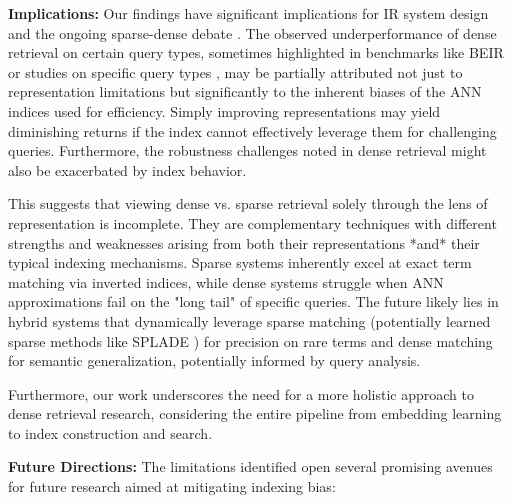 \documentclass[manuscript]{acmart}
\begin{document}
\textbf{Implications:} Our findings have significant implications for IR system design and the ongoing sparse-dense debate \cite{lin2024dense}. The observed underperformance of dense retrieval on certain query types, sometimes highlighted in benchmarks like BEIR \cite{thakur2021beir} or studies on specific query types \cite{sciavolino2021entityquestions}, may be partially attributed not just to representation limitations \cite{fan2022information} but significantly to the inherent biases of the ANN indices used for efficiency. Simply improving representations may yield diminishing returns if the index cannot effectively leverage them for challenging queries. Furthermore, the robustness challenges noted in dense retrieval \cite{zhan2021understanding} might also be exacerbated by index behavior.

This suggests that viewing dense vs. sparse retrieval solely through the lens of representation is incomplete. They are complementary techniques with different strengths and weaknesses arising from both their representations *and* their typical indexing mechanisms. Sparse systems inherently excel at exact term matching via inverted indices, while dense systems struggle when ANN approximations fail on the "long tail" of specific queries. The future likely lies in hybrid systems that dynamically leverage sparse matching (potentially learned sparse methods like SPLADE \cite{formal2021splade}) for precision on rare terms and dense matching for semantic generalization, potentially informed by query analysis.

Furthermore, our work underscores the need for a more holistic approach to dense retrieval research, considering the entire pipeline from embedding learning to index construction and search.

\textbf{Future Directions:} The limitations identified open several promising avenues for future research aimed at mitigating indexing bias:
\end{document}
